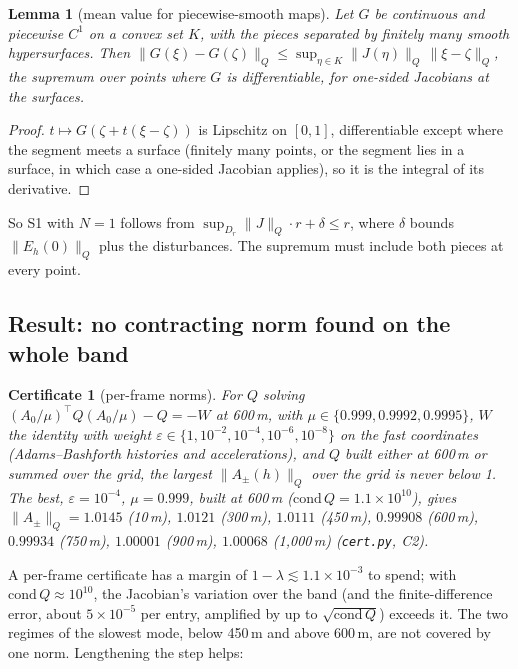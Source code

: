 \documentclass[11pt]{article}
\newtheorem{lemma}[theorem]{Lemma}
\newtheorem{cert}{Certificate}
\begin{document}
\begin{lemma}[mean value for piecewise-smooth maps]\label{lem:mv}
Let $G$ be continuous and piecewise $C^1$ on a convex set $K$, with the pieces separated by finitely many smooth hypersurfaces. Then $\|G(\xi) - G(\zeta)\|_Q \le \sup_{\eta \in K} \|J(\eta)\|_Q\, \|\xi - \zeta\|_Q$, the supremum over points where $G$ is differentiable, for one-sided Jacobians at the surfaces.
\end{lemma}
\begin{proof}
$t \mapsto G(\zeta + t(\xi - \zeta))$ is Lipschitz on $[0,1]$, differentiable except where the segment meets a surface (finitely many points, or the segment lies in a surface, in which case a one-sided Jacobian applies), so it is the integral of its derivative.
\end{proof}

So S1 with $N = 1$ follows from $\sup_{D_r}\|J\|_Q \cdot r + \delta \le r$, where $\delta$ bounds $\|E_h(0)\|_Q$ plus the disturbances. The supremum must include both pieces at every point.

\subsection{Result: no contracting norm found on the whole band}

\begin{cert}[per-frame norms]\label{cert:frame}
For $Q$ solving $(A_0/\mu)^\top Q (A_0/\mu) - Q = -W$ at 600\,m, with $\mu \in \{0.999, 0.9992, 0.9995\}$, $W$ the identity with weight $\varepsilon \in \{1, 10^{-2}, 10^{-4}, 10^{-6}, 10^{-8}\}$ on the fast coordinates (Adams--Bashforth histories and accelerations), and $Q$ built either at 600\,m or summed over the grid, the largest $\|A_\pm(h)\|_Q$ over the grid is never below 1. The best, $\varepsilon = 10^{-4}$, $\mu = 0.999$, built at 600\,m ($\mathrm{cond}\,Q = 1.1\times10^{10}$), gives $\|A_\pm\|_Q = 1.0145$ (10\,m), $1.0121$ (300\,m), $1.0111$ (450\,m), $0.99908$ (600\,m), $0.99934$ (750\,m), $1.00001$ (900\,m), $1.00068$ (1{,}000\,m) (\texttt{cert.py}, C2).
\end{cert}

A per-frame certificate has a margin of $1 - \lambda \lesssim 1.1\times10^{-3}$ to spend; with $\mathrm{cond}\,Q \approx 10^{10}$, the Jacobian's variation over the band (and the finite-difference error, about $5\times10^{-5}$ per entry, amplified by up to $\sqrt{\mathrm{cond}\,Q}$) exceeds it. The two regimes of the slowest mode, below 450\,m and above 600\,m, are not covered by one norm. Lengthening the step helps:
\end{document}
